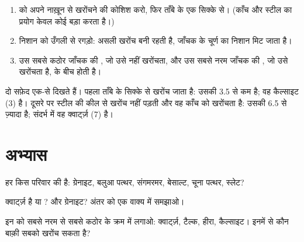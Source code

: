 \begin{method}[खरोंच जाँच]\label{met:g6:rocks-and-minerals:scratch}
\begin{enumerate}
  \item {} को अपने नाख़ून से खरोंचने की कोशिश करो, फिर ताँबे के एक
        सिक्के से। (काँच और स्टील का प्रयोग केवल कोई बड़ा करता है।)
  \item निशान को उँगली से रगड़ो: असली खरोंच बनी रहती है, जाँचक के चूर्ण का
        निशान मिट जाता है।
  \item {} उस सबसे कठोर जाँचक की , जो उसे नहीं खरोंचता, और उस सबसे
        नरम जाँचक की , जो उसे खरोंचता है, के बीच होती है।
\end{enumerate}
\end{method}

\begin{example}[क्वार्ट्ज़ या कैल्साइट?]\label{ex:g6:rocks-and-minerals:quartz-calcite}
दो सफ़ेद  एक-से दिखते हैं। पहला ताँबे के सिक्के से खरोंच जाता है:
उसकी  3.5 से कम है; वह कैल्साइट (3) है। दूसरे पर स्टील की कील से खरोंच नहीं
पड़ती और वह काँच को खरोंचता है: उसकी 
6.5 से ज़्यादा है; संदर्भ  में वह क्वार्ट्ज़ (7) है।
\end{example}

\section{अभ्यास}

\begin{exercise}[$\star$]\label{exo:g6:rocks-and-minerals:1}
हर  किस परिवार की है: ग्रेनाइट, बलुआ पत्थर, संगमरमर, बेसाल्ट,
चूना पत्थर, स्लेट?
\end{exercise}

\begin{exercise}[$\star$]\label{exo:g6:rocks-and-minerals:2}
क्वार्ट्ज़  है या ? और ग्रेनाइट? अंतर को एक
वाक्य में समझाओ।
\end{exercise}

\begin{exercise}[$\star$]\label{exo:g6:rocks-and-minerals:3}
इन  को सबसे नरम से सबसे कठोर के क्रम में लगाओ: क्वार्ट्ज़,
टैल्क, हीरा, कैल्साइट। इनमें से कौन बाक़ी सबको खरोंच सकता है?
\end{exercise}

